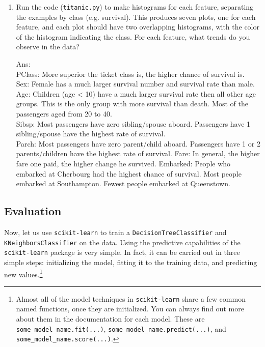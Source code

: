 \begin{enumerate}
\item {} Run the code (\verb|titanic.py|) to make histograms for each feature, separating the examples by class (e.g. survival). This produces seven plots, one for each feature, and each plot should have two overlapping histograms, with the color of the histogram indicating the class. For each feature, what trends do you observe in the data? 

Ans: \\
PClass: More superior the ticket class is, the higher chance of survival is. \\
Sex: Female has a much larger survival number and survival rate than male. \\
Age: Children (age < 10) have a much larger survival rate then all other age groups. This is the only group with more survival than death. Most of the passengers aged from 20 to 40. \\
Sibsp: Most passengers have zero sibling/spouse aboard. Passengers have 1 sibling/spouse have the highest rate of survival. \\
Parch: Most passengers have zero parent/child aboard. Passengers have 1 or 2 parents/children have the highest rate of survival. 
Fare: In general, the higher fare one paid, the higher change he survived. 
Embarked: People who embarked at Cherbourg had the highest chance of survival. Most people embarked at Southampton. Fewest people embarked at Queenstown. 
\end{enumerate}


\subsection{Evaluation }

Now, let us use \verb|scikit-learn| to train a \verb|DecisionTreeClassifier| and \verb|KNeighborsClassifier| on the data.
Using the predictive capabilities of the \verb|scikit-learn| package is very simple. In fact, it can be carried out in three simple steps: initializing the model, fitting it to the training data, and predicting new values.\footnote{Almost all of the model techniques in \verb|scikit-learn| share a few common named functions, once they are initialized. You can always find out more about them in the documentation for each model. These are \verb|some_model_name.fit(...)|, \verb|some_model_name.predict(...)|, and \verb|some_model_name.score(...)|.}


